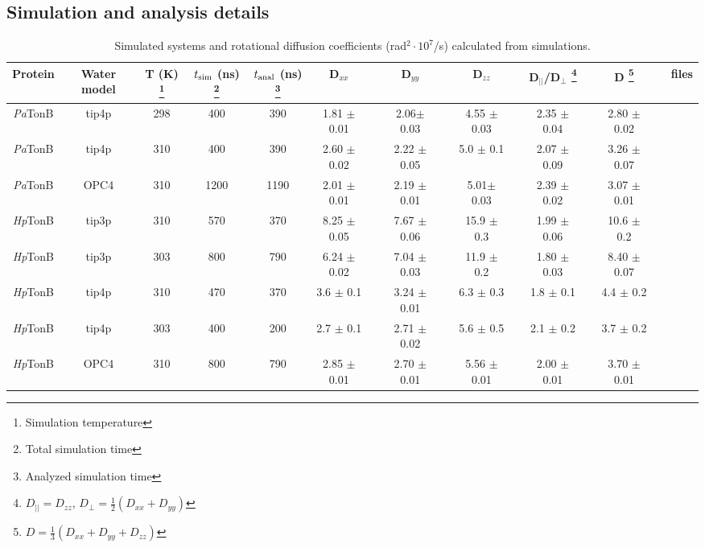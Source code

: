 \documentclass[pre,aps,floatfix,authordate1-4,twocolumn]{revtex4-1}
\begin{document}
\subsection{Simulation and analysis details}
\begin{table}[htb]
\centering
\caption{Simulated systems and rotational diffusion coefficients (rad$^2\cdot 10^7$/s) calculated from simulations.
}\label{ROTdiffCOEFFS}
\begin{tabular}{c c c c c c c c c c c c c c c c}
Protein     & Water model & T (K) \footnote{Simulation temperature}  &  $t_{\rm sim}$ (ns) \footnote{Total simulation time}  &  $t_{\rm anal}$ (ns) \footnote{Analyzed simulation time}  & D$_{xx}$ &&D$_{yy}$ &&D$_{zz}$ &&D$_{||}$/D$_\perp$ \footnote{$D_{||}=D_{zz}$, $D_\perp=\frac{1}{2}(D_{xx}+D_{yy})$} & &D \footnote{$D=\frac{1}{3}(D_{xx}+D_{yy}+D_{zz} )$}& &files \\
\hline
{\it Pa}TonB      & tip4p       & 298    & 400                 &  390                 & 1.81 $\pm$ 0.01 && 2.06$\pm$ 0.03 && 4.55 $\pm$ 0.03 && 2.35 $\pm$ 0.04 && 2.80 $\pm$ 0.02 && \cite{??} \\
{\it Pa}TonB      & tip4p       & 310    & 400                 &  390                 &  2.60 $\pm$ 0.02 &&  2.22 $\pm$ 0.05& &  5.0  $\pm$ 0.1  & &  2.07 $\pm$ 0.09& &   3.26 $\pm$  0.07 && \cite{??}\\
{\it Pa}TonB      & OPC4        & 310    & 1200                &  1190                &  2.01 $\pm$ 0.01 && 2.19 $\pm$ 0.01 && 5.01$\pm$ 0.03 && 2.39 $\pm$ 0.02 && 3.07 $\pm$ 0.01 && \cite{??}  \\
{\it Hp}TonB      & tip3p       & 310    & 570           	 &  370                 & 8.25 $\pm$ 0.05 && 7.67 $\pm$ 0.06 && 15.9 $\pm$ 0.3 && 1.99 $\pm$ 0.06 &&  10.6 $\pm$ 0.2 &&  \cite{??} \\
{\it Hp}TonB      & tip3p       & 303    & 800           	 &  790                 & 6.24 $\pm$ 0.02 && 7.04 $\pm$ 0.03 && 11.9 $\pm$ 0.2 && 1.80 $\pm$ 0.03 && 8.40 $\pm$ 0.07 && \cite{??} \\
{\it Hp}TonB      & tip4p       & 310    & 470           	 &  370                 & 3.6 $\pm$ 0.1 && 3.24 $\pm$ 0.01 && 6.3 $\pm$ 0.3 && 1.8 $\pm$ 0.1 && 4.4 $\pm$ 0.2 && \cite{??} \\
{\it Hp}TonB      & tip4p       & 303    & 400           	 &  200                 & 2.7 $\pm$ 0.1 && 2.71 $\pm$ 0.02 && 5.6 $\pm$ 0.5 && 2.1 $\pm$ 0.2 && 3.7 $\pm$ 0.2 && \cite{??} \\
{\it Hp}TonB      & OPC4        & 310    & 800           	 &  790                 & 2.85 $\pm$ 0.01 && 2.70 $\pm$ 0.01 && 5.56 $\pm$ 0.01 && 2.00 $\pm$ 0.01 && 3.70 $\pm$ 0.01 && \cite{??} \\
\end{tabular}
\end{table}
\end{document}
